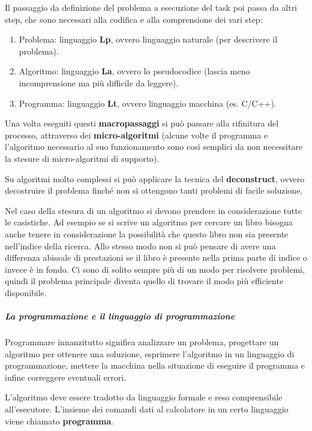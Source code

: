 \documentclass[
  paper=a4,
  oneside  ,captions=tableheading
]{scrbook}
\providecommand{\tightlist}{%
  \setlength{\itemsep}{0pt}\setlength{\parskip}{0pt}}
\begin{document}
Il passaggio da definizione del problema a esecuzione del task poi passa
da altri step, che sono necessari alla codifica e alla comprensione dei
vari step:

\begin{enumerate}
\def\labelenumi{\arabic{enumi}.}
\tightlist
\item
  Problema: linguaggio \textbf{Lp}, ovvero linguaggio naturale (per
  descrivere il problema).
\item
  Algoritmo: linguaggio \textbf{La}, ovvero lo pseudocodice (lascia meno
  incomprensione ma più difficile da leggere).
\item
  Programma: linguaggio \textbf{Lt}, ovvero linguaggio macchina (es.
  C/C++).
\end{enumerate}

Una volta eseguiti questi \textbf{macropassaggi} si può passare alla
rifinitura del processo, attraverso dei \textbf{micro-algoritmi} (alcune
volte il programma e l'algoritmo necessario al suo funzionamento sono
così semplici da non necessitare la stesure di micro-algoritmi di
supporto).

Su algoritmi molto complessi si può applicare la tecnica del
\textbf{deconstruct}, ovvero decostruire il problema finché non si
ottengono tanti problemi di facile soluzione.

Nel caso della stesura di un algoritmo si devono prendere in
considerazione tutte le casistiche. Ad esempio se si scrive un algoritmo
per cercare un libro bisogna anche tenere in considerazione la
possibilità che questo libro non sia presente nell'indice della ricerca.
Allo stesso modo non si può pensare di avere una differenza abissale di
prestazioni se il libro è presente nella prima parte di indice o invece
è in fondo. Ci sono di solito sempre più di un modo per risolvere
problemi, quindi il problema principale diventa quello di trovare il
modo più efficiente disponibile.

\hypertarget{la-programmazione-e-il-linguaggio-di-programmazione}{%
\subparagraph{La programmazione e il linguaggio di
programmazione}\label{la-programmazione-e-il-linguaggio-di-programmazione}}

Programmare innanzitutto significa analizzare un problema, progettare un
algoritmo per ottenere una soluzione, esprimere l'algoritmo in un
linguaggio di programmazione, mettere la macchina nella situazione di
eseguire il programma e infine correggere eventuali errori.

L'algoritmo deve essere tradotto da linguaggio formale e reso
comprensibile all'esecutore. L'insieme dei comandi dati al calcolatore
in un certo linguaggio viene chiamato \textbf{programma}.
\end{document}
